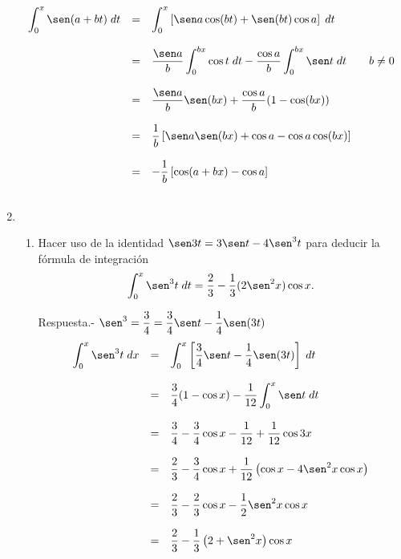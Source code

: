 \begin{enumerate}
	 $$\begin{array}{rcl}
	     \displaystyle\int_0^x \sen(a+bt)\; dt&=&\displaystyle\int_0^x \left[\sen a \cos(bt)+\sen(bt)\cos a\right]\; dt\\\\
						  &=&\dfrac{\sen a}{b} \displaystyle\int_0^{bx} \cos t \; dt - \dfrac{\cos a}{b}\int_0^{bx} \sen t \; dt \qquad b\neq 0\\\\
						  &=&\dfrac{\sen a}{b}\sen(bx)+\dfrac{\cos a}{b}(1-\cos(bx))\\\\
						  &=&\dfrac{1}{b}\left[\sen a \sen (bx) + \cos a - \cos a \cos (bx)\right]\\\\
						  &=&-\dfrac{1}{b} \left[\cos(a+bx)-\cos a\right]\\\\
	 \end{array}$$

\item 
    \begin{enumerate}[\bfseries (a)]

	\item Hacer uso de la identidad $\sen 3t = 3 \sen t  - 4 \sen^3 t$ para deducir la fórmula de integración
	    $$\int_0^x \sen^3 t \;dt = \frac{2}{3} - \frac{1}{3}(2\sen^2x)\cos x.$$

	    Respuesta.-\; $\sen^3 = \dfrac{3}{4} = \dfrac{3}{4}\sen t - \dfrac{1}{4}\sen(3t)$
	    $$ \begin{array}{rcl}
		\displaystyle\int_0^x \sen^3 t \; dx&=&\displaystyle \int_0^x\left[\dfrac{3}{4}\sen t - \dfrac{1}{4}\sen (3t)\right]\; dt\\\\
						    &=&\dfrac{3}{4}(1-\cos x)-\dfrac{1}{12}\displaystyle \int_0^x \sen t \; dt\\\\
						    &=&\dfrac{3}{4} - \dfrac{3}{4}\cos x - \dfrac{1}{12}+\dfrac{1}{12} \cos 3x\\\\
						    &=&\dfrac{2}{3}-\dfrac{3}{4}\cos x + \dfrac{1}{12}\left(\cos x  - 4\sen^2 x \cos x\right)\\\\
						    &=&\dfrac{2}{3}-\dfrac{2}{3}\cos x - \dfrac{1}{2}\sen^2 x \cos x\\\\
						    &=&\dfrac{2}{3}-\dfrac{1}{3}\left(2+\sen^2 x\right)\cos x\\\\
	    \end{array}$$


\end{enumerate}
\end{enumerate}
